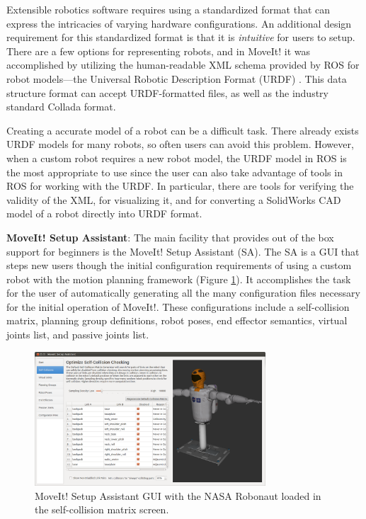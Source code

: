 \documentclass[10pt,journal,compsoc]{joser1}
\begin{document}
{Extensible robotics software requires using a standardized format that can express the intricacies of varying hardware configurations. An additional design requirement for this standardized format is that it is \textit{intuitive} for users to setup. There are a few options for representing robots, and in MoveIt! it was accomplished by utilizing the human-readable XML schema provided by ROS for robot models---the Universal Robotic Description Format (URDF) \cite{urdf}. This data structure format can accept URDF-formatted files, as well as the industry standard Collada \cite{collada} format. 

Creating a accurate model of a robot can be a difficult task. There already exists URDF models for many robots, so often users can avoid this problem. However, when a custom robot requires a new robot model, the URDF model in ROS is the most appropriate to use since the user can also take advantage of tools in ROS for working with the URDF. In particular, there are tools for verifying the validity of the XML, for visualizing it, and for converting a SolidWorks CAD model of a robot directly into URDF format. 

{\bf MoveIt! Setup Assistant}: The main facility that provides out of the box support for beginners is the MoveIt! Setup Assistant (SA). The SA is a GUI that steps new users though the initial configuration requirements of using a custom robot with the motion planning framework (Figure \ref{fig:setupassistant}). It accomplishes the task for the user of automatically generating all the many configuration files necessary for the initial operation of MoveIt!. These configurations include a self-collision matrix, planning group definitions, robot poses, end effector semantics, virtual joints list, and passive joints list. 

\begin{figure}[!t]
\centering
\includegraphics[width=3.4in]{images/setup_assistant}
\caption{MoveIt! Setup Assistant GUI with the NASA Robonaut loaded in the self-collision matrix screen.}
\label{fig:setupassistant}
\end{figure}

}
\end{document}
